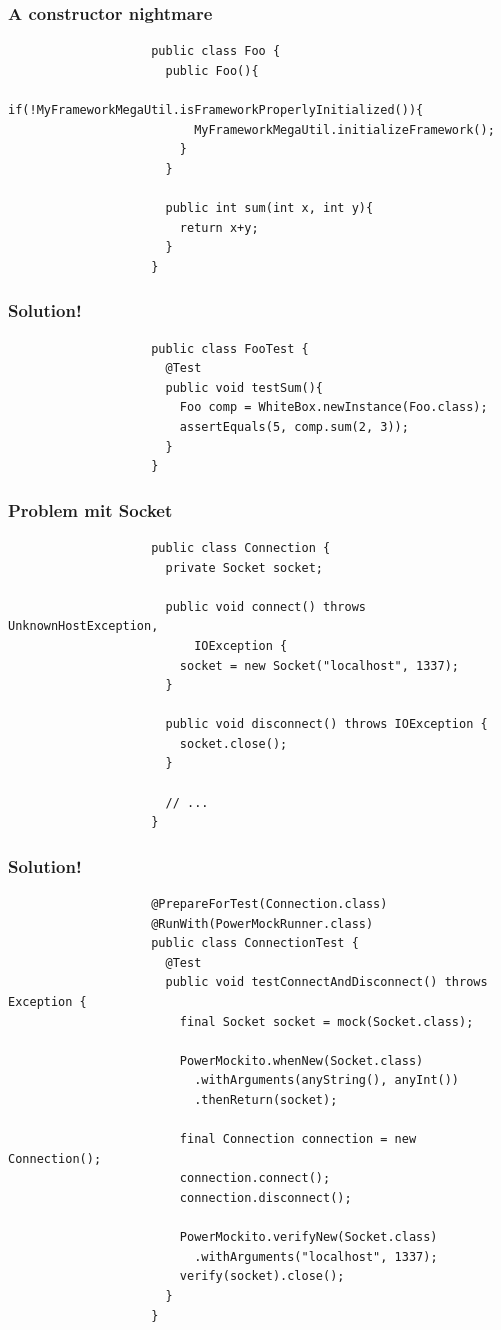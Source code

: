 \documentclass{beamer}
\begin{document}
			\begin{frame}[fragile]
				\frametitle{A constructor nightmare}

				\begin{lstlisting}
					public class Foo {
					  public Foo(){
					    if(!MyFrameworkMegaUtil.isFrameworkProperlyInitialized()){
					      MyFrameworkMegaUtil.initializeFramework();	
					    }
					  }

					  public int sum(int x, int y){
					    return x+y;
					  }
					}
				\end{lstlisting}
			\end{frame}

			\begin{frame}[fragile]
				\frametitle{Solution!}

				\begin{lstlisting}
					public class FooTest {
					  @Test
					  public void testSum(){
					    Foo comp = WhiteBox.newInstance(Foo.class);
					    assertEquals(5, comp.sum(2, 3));
					  }
					}
				\end{lstlisting}
			\end{frame}

			\begin{frame}[fragile]
				\frametitle{Problem mit Socket}

				\begin{lstlisting}
					public class Connection {
					  private Socket socket;

					  public void connect() throws UnknownHostException,
					      IOException {
					    socket = new Socket("localhost", 1337);
					  }

					  public void disconnect() throws IOException {
					    socket.close();
					  }

					  // ...
					}
				\end{lstlisting}
			\end{frame}

			\begin{frame}[fragile]
				\frametitle{Solution!}

				\begin{lstlisting}
					@PrepareForTest(Connection.class)
					@RunWith(PowerMockRunner.class)
					public class ConnectionTest {
					  @Test
					  public void testConnectAndDisconnect() throws Exception {
					    final Socket socket = mock(Socket.class);

					    PowerMockito.whenNew(Socket.class)
					      .withArguments(anyString(), anyInt())
					      .thenReturn(socket);

					    final Connection connection = new Connection();
					    connection.connect();
					    connection.disconnect();

					    PowerMockito.verifyNew(Socket.class)
					      .withArguments("localhost", 1337);
					    verify(socket).close();
					  }
					}
				\end{lstlisting}
			\end{frame}
\end{document}

